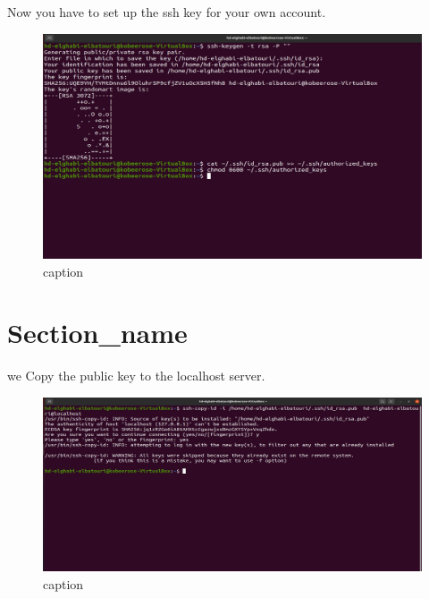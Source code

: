\begin{spacing}{1.2}
\par Now you have to set up the ssh key for your own account.
\\
\begin{figure}[!htb] 
\begin{center} 
\includegraphics[width=1\linewidth]{Big_Data/Hadoop/Apache Hadoop Installation/Creating SSH key.jpg} 
\end{center} 
\caption{caption} 
\end{figure} 
\FloatBarrier

\section{Section_name}

\par we Copy the public key to the localhost server.
\\
\begin{figure}[!htb] 
\begin{center} 
\includegraphics[width=1\linewidth]{Big_Data/Hadoop/Apache Hadoop Installation/Copying the key.jpg} 
\end{center} 
\caption{caption} 
\end{figure} 
\FloatBarrier




\end{spacing}
